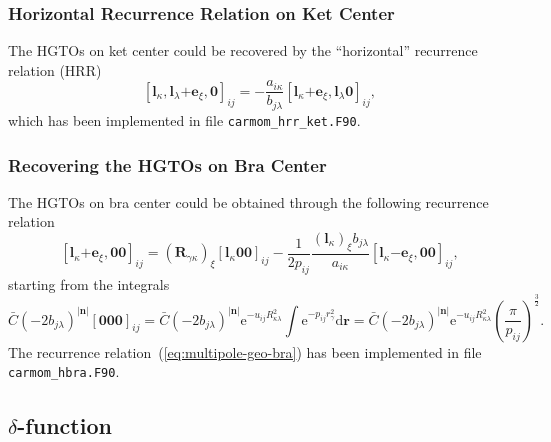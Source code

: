 \documentclass[a4paper,11pt,twoside,openright]{book}
\begin{document}
\subsubsection{Horizontal Recurrence Relation on Ket Center}

The HGTOs on ket center could be recovered by the ``horizontal'' recurrence relation (HRR)~\cite{Reine:PCCP9:4771}
\begin{equation}
  \label{eq:multipole-hrr}
  \left[\boldsymbol{l}_{\kappa},\boldsymbol{l}_{\lambda}\mathrm{+}\boldsymbol{e}_{\xi},%
    \boldsymbol{0}\right]_{ij}
  =-\frac{a_{i\kappa}}{b_{j\lambda}}\left[\boldsymbol{l}_{\kappa}\mathrm{+}\boldsymbol{e}_{\xi},%
    \boldsymbol{l}_{\lambda}\boldsymbol{0}\right]_{ij},
\end{equation}
which has been implemented in file \verb|carmom_hrr_ket.F90|.

\subsubsection{Recovering the HGTOs on Bra Center}

The HGTOs on bra center could be obtained through the following recurrence relation~\cite{Reine:PCCP9:4771}
\begin{equation}
  \label{eq:multipole-geo-bra}
  \left[\boldsymbol{l}_{\kappa}\mathrm{+}\boldsymbol{e}_{\xi},\boldsymbol{00}\right]_{ij}
  =(\boldsymbol{R}_{\gamma\kappa})_{\xi}\left[\boldsymbol{l}_{\kappa}\boldsymbol{00}\right]_{ij}
  -\frac{1}{2p_{ij}}
    \frac{(\boldsymbol{l}_{\kappa})_{\xi}b_{j\lambda}}{a_{i\kappa}}%
      \left[\boldsymbol{l}_{\kappa}\mathrm{-}\boldsymbol{e}_{\xi},\boldsymbol{00}\right]_{ij},
\end{equation}
starting from the integrals
\begin{equation}
  \bar{C}(-2b_{j\lambda})^{|\boldsymbol{n}|}\left[\boldsymbol{000}\right]_{ij}
  =\bar{C}(-2b_{j\lambda})^{|\boldsymbol{n}|}\mathrm{e}^{-u_{ij}R_{\kappa\lambda}^2}%
    \int\mathrm{e}^{-p_{ij}r_{\gamma}^2}\mathrm{d}\boldsymbol{r}
  =\bar{C}(-2b_{j\lambda})^{|\boldsymbol{n}|}\mathrm{e}^{-u_{ij}R_{\kappa\lambda}^2}%
    \left(\frac{\pi}{p_{ij}}\right)^{\frac{3}{2}}.
\end{equation}
The recurrence relation~(\ref{eq:multipole-geo-bra}) has been implemented in file \verb|carmom_hbra.F90|.

\subsection[Dirac delta Function]{$\delta$-function}
\label{subsec:delta}
\end{document}
